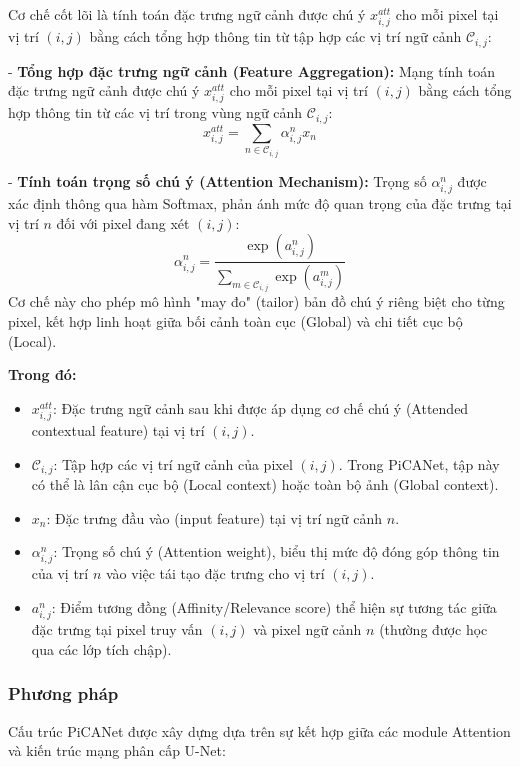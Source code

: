 Cơ chế cốt lõi là tính toán đặc trưng ngữ cảnh được chú ý $x_{i,j}^{att}$ cho mỗi pixel tại vị trí $(i,j)$ bằng cách tổng hợp thông tin từ tập hợp các vị trí ngữ cảnh $\mathcal{C}_{i,j}$:

- \textbf{Tổng hợp đặc trưng ngữ cảnh (Feature Aggregation):} Mạng tính toán đặc trưng ngữ cảnh được chú ý $x_{i,j}^{att}$ cho mỗi pixel tại vị trí $(i,j)$ bằng cách tổng hợp thông tin từ các vị trí trong vùng ngữ cảnh $\mathcal{C}_{i,j}$:
\begin{equation}
x_{i,j}^{att} = \sum_{n \in \mathcal{C}_{i,j}} \alpha_{i,j}^n x_n
\end{equation}

- \textbf{Tính toán trọng số chú ý (Attention Mechanism):} Trọng số $\alpha_{i,j}^n$ được xác định thông qua hàm Softmax, phản ánh mức độ quan trọng của đặc trưng tại vị trí $n$ đối với pixel đang xét $(i,j)$:
\begin{equation}
\alpha_{i,j}^n = \frac{\exp(a_{i,j}^n)}{\sum_{m \in \mathcal{C}_{i,j}} \exp(a_{i,j}^m)}
\end{equation}
Cơ chế này cho phép mô hình "may đo" (tailor) bản đồ chú ý riêng biệt cho từng pixel, kết hợp linh hoạt giữa bối cảnh toàn cục (Global) và chi tiết cục bộ (Local).

\noindent \textbf{Trong đó:}
\begin{itemize}
    \item $x_{i,j}^{att}$: Đặc trưng ngữ cảnh sau khi được áp dụng cơ chế chú ý (Attended contextual feature) tại vị trí $(i,j)$.
    \item $\mathcal{C}_{i,j}$: Tập hợp các vị trí ngữ cảnh của pixel $(i,j)$. Trong PiCANet, tập này có thể là lân cận cục bộ (Local context) hoặc toàn bộ ảnh (Global context).
    \item $x_n$: Đặc trưng đầu vào (input feature) tại vị trí ngữ cảnh $n$.
    \item $\alpha_{i,j}^n$: Trọng số chú ý (Attention weight), biểu thị mức độ đóng góp thông tin của vị trí $n$ vào việc tái tạo đặc trưng cho vị trí $(i,j)$.
    \item $a_{i,j}^n$: Điểm tương đồng (Affinity/Relevance score) thể hiện sự tương tác giữa đặc trưng tại pixel truy vấn $(i,j)$ và pixel ngữ cảnh $n$ (thường được học qua các lớp tích chập).
\end{itemize}

\subsubsection{Phương pháp}
\noindent Cấu trúc PiCANet được xây dựng dựa trên sự kết hợp giữa các module Attention và kiến trúc mạng phân cấp U-Net:

